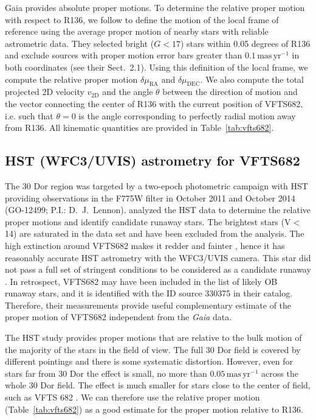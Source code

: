\documentclass[a4paper,fleqn,usenatbib]{mnras}
\newcommand{\masyr}{\,\mathrm{mas}\,\mathrm{yr}^{-1}}
\DeclareRobustCommand{\Tabref}[1]{Table~\ref{#1}}
\begin{document}
Gaia provides absolute proper motions.  To determine the relative
proper motion with respect to R136, we follow  \citet{lennon:18} to
define the motion of the local frame of reference using the average
proper motion of nearby stars with reliable astrometric data.  They
selected bright ($G<17$) stars within 0.05 degrees of R136 and exclude
sources with proper motion error bars greater than $0.1\masyr$ in both
coordinates (see their  Sect.~2.1).  Using this definition of the
local frame, we compute the relative proper motion
$\delta\mu_\mathrm{RA}$ and $\delta\mu_\mathrm{DEC}$.   We also compute the total projected 2D velocity
$v_\mathrm{2D}$ and the angle $\theta$ between the direction of motion and the vector
connecting the center of R136 with the current position of VFTS682,
i.e. such that $\theta = 0$ is the angle corresponding to perfectly
radial motion away from R136. All kinematic quantities are provided in
\Tabref{tab:vfts682}. 

\vspace*{-20pt}
\subsection{HST (WFC3/UVIS) astrometry for VFTS682}

The 30 Dor region was targeted by a two-epoch photometric campaign
with HST providing observations in the F775W filter in October 2011
and October 2014 (GO-12499; P.I.: D.~J.~Lennon). 
\citet{platais:15, platais:18} analyzed the HST data to determine the
relative proper motions and identify candidate runaway stars. The
brightest stars (V$<$14) are saturated in the data set and have been
excluded from the analysis. The high extinction around VFTS682
makes it redder and fainter \citep[$V=16.08$,
$B-V=0.58$,][]{evans:11}, hence it has reasonably accurate HST astrometry
with the WFC3/UVIS camera. This star did not pass a full set of stringent
conditions to be considered as a candidate runaway \citep[][]{platais:18}.
In retrospect, VFTS682 may have been included in the list of likely
OB runaway stars, and it is identified
with the ID source 330375 in their catalog. 
Therefore, their measurements provide useful
complementary estimate of the proper motion of VFTS682 independent from the \emph{Gaia} data. 
 
The HST study provides proper motions that are relative to the bulk motion
of the majority of the stars in the field of view. The full 30 Dor
field is covered by different pointings and there is some systematic
distortion.  However, even for stars far from 30 Dor the effect is
small, no more than $0.05\masyr$ across the whole 30 Dor field. The
effect is much smaller for stars close to the center of field, such as
VFTS 682 \citep{platais:18}.  We can therefore use the relative proper
motion (\Tabref{tab:vfts682}) as a good estimate for the proper motion relative to R136. 
 
\end{document}
